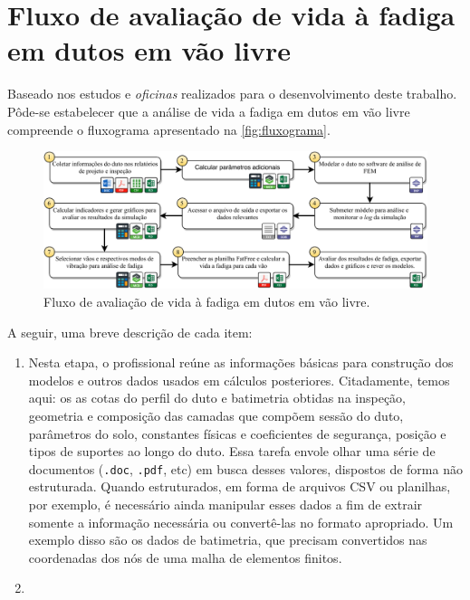 \section{Fluxo de avaliação de vida à fadiga em dutos em vão livre}\label{chap:workflow}


Baseado nos estudos e \textit{oficinas} realizados para o desenvolvimento deste trabalho. Pôde-se estabelecer que a análise de vida a fadiga em dutos em vão livre compreende o fluxograma apresentado na \autoref{fig:fluxograma}.

\begin{figure}[!ht]
    \centering
    \caption{Fluxo de avaliação de vida à fadiga em dutos em vão livre.}\label{fig:fluxograma}
    \includegraphics[width=\textwidth]{imagens/fluxograma.pdf}
\end{figure}

A seguir, uma breve descrição de cada item:

\begin{enumerate}[label=(\arabic*)]
    \item Nesta etapa, o profissional reúne as informações básicas para construção dos modelos e outros dados usados em cálculos posteriores. Citadamente, temos aqui: os as cotas do perfil do duto e batimetria obtidas na inspeção, geometria e composição das camadas que compõem sessão do duto, parâmetros do solo, constantes físicas e coeficientes de segurança, posição e tipos de suportes ao longo do duto. Essa tarefa envole olhar uma série de documentos (\texttt{.doc}, \texttt{.pdf}, etc) em busca desses valores, dispostos de forma não estruturada. Quando estruturados, em forma de arquivos CSV ou planilhas, por exemplo, é necessário ainda manipular esses dados a fim de extrair somente a informação necessária ou convertê-las no formato apropriado. Um exemplo disso são os dados de batimetria, que precisam convertidos nas coordenadas dos nós de uma malha de elementos finitos.
    \item 
\end{enumerate}{}